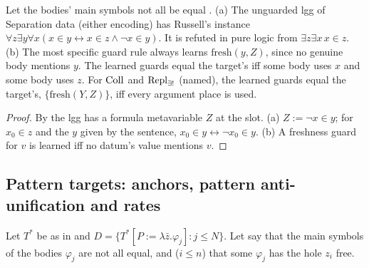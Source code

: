 \begin{proposition}\label{prop:zf:russell}
Let the bodies' main symbols not all be equal \evR.
(a) The unguarded lgg of Separation data (either encoding) has Russell's instance $\forall z\exists y\forall x(x\in
y\leftrightarrow x\in z\wedge\neg x\in y)$. It is refuted in pure logic from $\exists z\exists x\,x\in z$.
(b) The most specific guard rule always learns $\mathrm{fresh}(y,Z)$, since no genuine body mentions $y$. The learned
guards equal the target's iff some body uses $x$ and some body uses $z$. For $\mathrm{Coll}$ and $\mathrm{Repl}_{\exists!}$ (named), the learned
guards equal the target's, $\{\mathrm{fresh}(Y,Z)\}$, iff every argument place is used.
\end{proposition}
\begin{proof}
By \evR{} the lgg has a formula metavariable $Z$ at the slot. (a) $Z:=\neg x\in y$; for $x_0\in z$ and the $y$ given by
the sentence, $x_0\in y\leftrightarrow\neg x_0\in y$. (b) A freshness guard for $v$ is learned iff no datum's value
mentions $v$.
\end{proof}

\subsection{Pattern targets: anchors, pattern anti-unification and rates}\label{sec:zf:pattern}

Let $T^*$ be as in  and $D=\{T^*[P:=\lambda\bar z.\varphi_j]:j\le N\}$. Let \evR{} say that the main
symbols of the bodies $\varphi_j$ are not all equal, and  ($i\le n$) that some $\varphi_j$ has the hole $z_i$
free.

